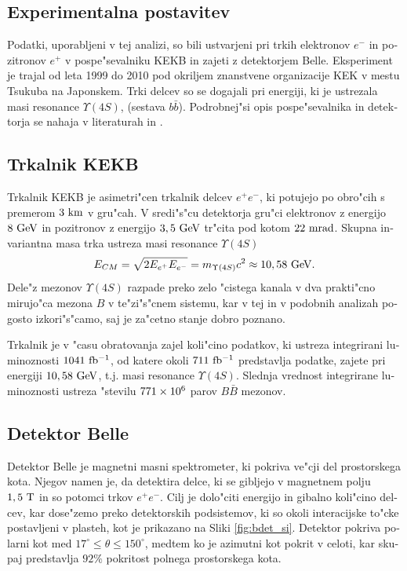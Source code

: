 \begin{otherlanguage}{slovene}
\section{Experimentalna postavitev}

Podatki, uporabljeni v tej analizi, so bili ustvarjeni pri trkih elektronov $e^-$ in pozitronov $e^+$ v pospe"sevalniku KEKB in zajeti z detektorjem Belle. Eksperiment je trajal od leta 1999 do 2010 pod okriljem znanstvene organizacije KEK v mestu Tsukuba na Japonskem. Trki delcev so se dogajali pri energiji, ki je ustrezala masi resonance $\Upsilon(4S)$, (sestava $b \bar b$). Podrobnej"si opis pospe"sevalnika in detektorja se nahaja v literaturah \cite{doi:10.1093/ptep/pts102} in \cite{ABASHIAN2002117}.

\subsection{Trkalnik KEKB}
Trkalnik KEKB je asimetri"cen trkalnik delcev $e^+e^-$, ki potujejo po obro"cih s premerom $3\mathrm{~km}$ v gru"cah. V sredi"s"cu detektorja gru"ci elektronov z energijo $8\mathrm{~GeV}$ in pozitronov z energijo $3,5\mathrm{~GeV}$ tr"cita pod kotom $22\mathrm{~mrad}$. Skupna invariantna masa trka ustreza masi resonance $\Upsilon(4S)$ 
\begin{equation}
E_{CM} = \sqrt{2E_{e^+}E_{e^-}} = m_{\Upsilon(4S)}c^2 \approx 10,58\mathrm{~GeV}.
\end{equation}
Dele"z mezonov $\Upsilon(4S)$ razpade preko zelo "cistega kanala v dva prakti"cno mirujo"ca mezona $B$ v te"zi"s"cnem sistemu, kar v tej in v podobnih analizah pogosto izkori"s"camo, saj je za"cetno stanje dobro poznano.

Trkalnik je v "casu obratovanja zajel koli"cino podatkov, ki ustreza integrirani luminoznosti $1041\mathrm{~fb^{-1}}$, od katere okoli $711\mathrm{~fb^{-1}}$ predstavlja podatke, zajete pri energiji $10,58\mathrm{~GeV}$, t.j. masi resonance $\Upsilon(4S)$. Slednja vrednost integrirane luminoznosti ustreza "stevilu $771\times 10^{6}$ parov $B \bar B$ mezonov.

\subsection{Detektor Belle}
Detektor Belle je magnetni masni spektrometer, ki pokriva ve"cji del prostorskega kota. Njegov namen je, da detektira delce, ki se gibljejo v magnetnem polju $1,5\mathrm{~T}$ in so potomci trkov $e^+e^-$. Cilj je dolo"citi energijo in gibalno koli"cino delcev, kar dose"zemo preko detektorskih podsistemov, ki so okoli interacijske to"cke postavljeni v plasteh, kot je prikazano na Sliki \ref{fig:bdet_si}. Detektor pokriva polarni kot med $17^\circ \leq \theta \leq 150^\circ$, medtem ko je azimutni kot pokrit v celoti, kar skupaj predstavlja $92\%$ pokritost polnega prostorskega kota.


\end{otherlanguage}
